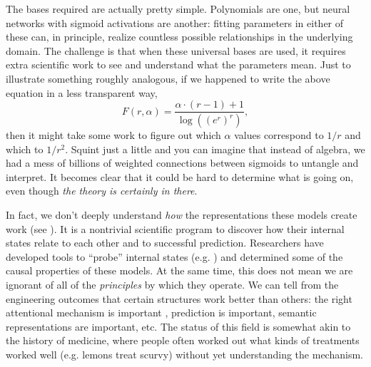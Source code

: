 \documentclass[output=paper,colorlinks,citecolor=brown]{langscibook}
\begin{document}
The bases required are actually pretty simple. Polynomials are one, but neural networks with sigmoid activations are another: fitting parameters in either of these can, in principle, realize countless possible relationships in the underlying domain. The challenge is that when these universal bases are used, it requires extra scientific work to see and understand what the parameters mean. Just to illustrate something roughly analogous, if we happened to write the above equation in a less transparent way, 
\[
F(r,\alpha) = \frac{\alpha \cdot (r-1) + 1}{\log \left(\left(e^r\right)^{r}\right)},
\]
then it might take some work to figure out which $\alpha$ values correspond to $1/r$ and which to $1/r^2$. Squint just a little and you can imagine that instead of algebra, we had a mess of billions of weighted connections between sigmoids to untangle and interpret. It becomes clear that it could be hard to determine what is going on, even though \textit{the theory is certainly in there}.

In fact, we don't deeply understand \textit{how} the representations these models create work (see \citealt{rogers2021primer}). It is a nontrivial scientific program to discover how their internal states relate to each other and to successful prediction. Researchers have developed tools to ``probe'' internal states (e.g. \citealt{belinkov2019analysis,tenney2019you,kim2019probing,linzen2021syntactic,warstadt2022artificial,pavlick2022semantic}) and determined some of the causal properties of these models. At the same time, this does not mean we are ignorant of all of the \textit{principles} by which they operate. We can tell from the engineering outcomes that certain structures work better than others: the right attentional mechanism is important \citep{vaswani2017attention}, prediction is important, semantic representations are important, etc. The status of this field is somewhat akin to the history of medicine, where people often worked out what kinds of treatments worked well (e.g. lemons treat scurvy) without yet understanding the mechanism. 
\end{document}
